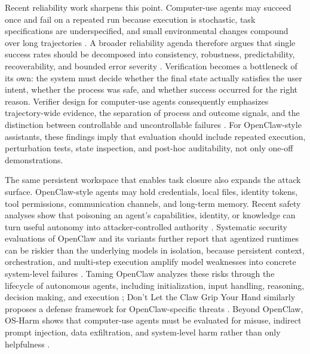 Recent reliability work sharpens this point.
Computer-use agents may succeed once and fail on a repeated run because execution is stochastic, task specifications are underspecified, and small environmental changes compound over long trajectories \cite{reliability2026computeruse}.
A broader reliability agenda therefore argues that single success rates should be decomposed into consistency, robustness, predictability, recoverability, and bounded error severity \cite{rabanser2026sciencereliability}.
Verification becomes a bottleneck of its own: the system must decide whether the final state actually satisfies the user intent, whether the process was safe, and whether success occurred for the right reason.
Verifier design for computer-use agents consequently emphasizes trajectory-wide evidence, the separation of process and outcome signals, and the distinction between controllable and uncontrollable failures \cite{rosset2026verifiers}.
For OpenClaw-style assistants, these findings imply that evaluation should include repeated execution, perturbation tests, state inspection, and post-hoc auditability, not only one-off demonstrations.

The same persistent workspace that enables task closure also expands the attack surface.
OpenClaw-style agents may hold credentials, local files, identity tokens, tool permissions, communication channels, and long-term memory.
Recent safety analyses show that poisoning an agent's capabilities, identity, or knowledge can turn useful autonomy into attacker-controlled authority \cite{wang2026youragent}.
Systematic security evaluations of OpenClaw and its variants further report that agentized runtimes can be riskier than the underlying models in isolation, because persistent context, orchestration, and multi-step execution amplify model weaknesses into concrete system-level failures \cite{wang2026openclawsec}.
Taming OpenClaw analyzes these risks through the lifecycle of autonomous agents, including initialization, input handling, reasoning, decision making, and execution \cite{deng2026tamingopenclaw}; Don't Let the Claw Grip Your Hand similarly proposes a defense framework for OpenClaw-specific threats \cite{shan2026dontlettheclaw}.
Beyond OpenClaw, OS-Harm shows that computer-use agents must be evaluated for misuse, indirect prompt injection, data exfiltration, and system-level harm rather than only helpfulness \cite{kuntz2026osharm}.

